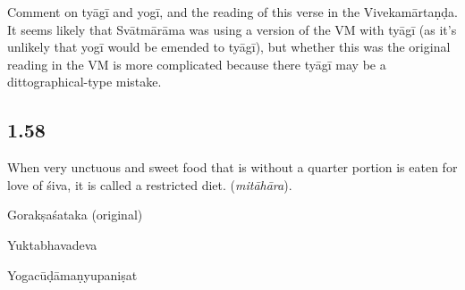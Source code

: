 \begin{ekdosis}
\begin{testimonia}[hp01_057]
\end{testimonia}

\begin{philcomm}[hp01_057]
Comment on tyāgī and yogī, and the reading of this verse in the Vivekamārtaṇḍa. It seems likely that Svātmārāma was using a version of the VM with tyāgī (as it’s unlikely that yogī would be emended to tyāgī), but whether this was the original reading in the VM is more complicated because there tyāgī may be a dittographical-type mistake. 
\end{philcomm}

\subsection*{1.58}
\begin{translation}[hp01_058]
When very unctuous and sweet food that is without a quarter portion is eaten for love of śiva, it is called a restricted diet. (\emph{mitāhāra}).
\end{translation}

\begin{sources}[hp01_058]
Gorakṣaśataka (original)

\begin{versinnote}
\end{versinnote}

\end{sources}

\begin{testimonia}[hp01_058]
Yuktabhavadeva

\begin{versinnote}
\end{versinnote}

Yogacūḍāmaṇyupaniṣat

\begin{versinnote}
\end{versinnote}


\end{testimonia}
\end{ekdosis}
